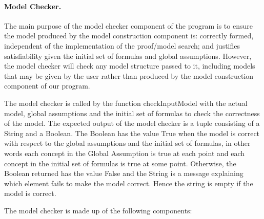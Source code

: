 \paragraph{Model Checker.}
  The main purpose of the model checker component of the program is to
  ensure the model produced by the model construction component is:
   correctly formed, independent of the implementation of the proof/model
   search; and justifies satisfiability given the initial set of formulas
   and global assumptions. However, the model checker will check any
   model structure passed to it, including models that may be given by
   the user rather than produced by the model construction component of
   our program.

   The model checker is called by the function checkInputModel with the actual
   model, global assumptions and the initial set of formulas to check
   the correctness of the model. The expected output of the
   model checker is a tuple consisting of a String and a Boolean. The
   Boolean has the value True when the model is correct with respect
   to the global assumptions and the initial set of formulas, in other words
   each concept in the Global Assumption is true at each point and each concept  in the
   initial set of formulas is true at some point.
   Otherwise, the Boolean returned
   has the value False and the String is a message explaining which
   element fails to make the model correct.
   Hence the string is empty if the model is correct.

   The model checker is made up of the following components:

